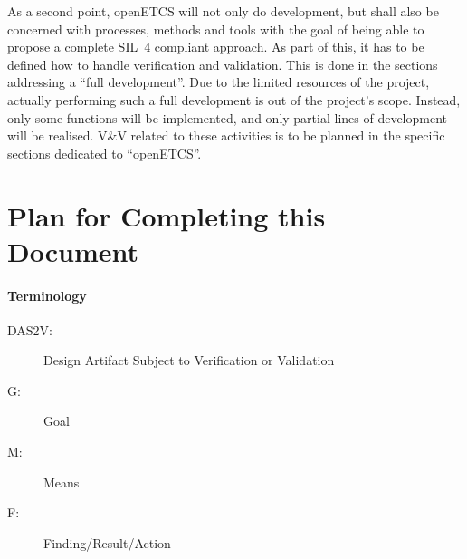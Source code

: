 \documentclass{template/openetcs_report}
\begin{document}
As a second point, openETCS will not only do development, but
shall also be concerned with processes, methods and tools with the
goal of being able to propose a complete SIL~4 compliant approach. As
part of this, it has to be defined how to handle verification and
validation. This is done in the sections
addressing a ``full development''. Due to the limited resources of the
project, actually performing such a full development is out of the
project's scope. Instead, only some functions will be implemented, and
only partial lines of development will be realised. V\&V related to
these activities is to be planned in the specific sections dedicated
to  ``openETCS''.  

\section{Plan for Completing this Document}
\label{sec:plan-completing-this}

{\it
\paragraph{Terminology}
\label{sec:terminology}
\begin{description}
\item [DAS2V:] Design Artifact Subject to Verification or Validation
\item[G:] Goal
\item[M:] Means
\item[F:] Finding/Result/Action
\end{description}
}
\end{document}
